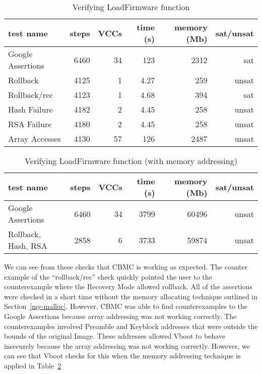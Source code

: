 \begin{table}[!htbp]
    \centering
    \caption{Verifying LoadFirmware function}\label{ldfw_results}
    \begin{tabular}{lrrrrr}
        \toprule
        test name & steps & VCCs  & time (s) & memory (Mb) & sat/unsat  \\ \midrule
        Google Assertions & 6460 & 34 & 123 & 2312 & sat \\
        Rollback     & 4125 & 1 & 4.27 & 259 & unsat \\
        Rollback/rec & 4123 & 1 & 4.68 & 394 & sat \\
        Hash Failure & 4182 & 2 & 4.45 & 258 & unsat \\
        RSA  Failure & 4180 & 2 & 4.45 & 258 & unsat \\
        Array Accesses & 4130 & 57 & 126 & 2487 & unsat \\\bottomrule
    \end{tabular}
\end{table}

\begin{table}[!htbp]
    \centering
    \caption{Verifying LoadFirmware function (with memory addressing)}\label{ldfw_results_malloc}
    \begin{tabular}{lrrrrr}
        \toprule
        test name & steps & VCCs  & time (s) & memory (Mb) & sat/unsat  \\ \midrule
        Google Assertions & 6460 & 34 & 3799 & 60496 & unsat \\
        Rollback, Hash, RSA & 2858 & 6 & 3733 & 59874 & unsat \\\bottomrule
    \end{tabular}
\end{table}

We can see from these checks that CBMC is working as expected.
The counter example of the ``rollback/rec'' check  quickly pointed the user to the counterexample where the Recovery Mode allowed rollback.
All of the assertions were checked in a short time without the memory allocating technique outlined in Section~\ref{my-malloc}. 
However, CBMC was able to find counterexamples to the Google Assertions because array addressing was not working correctly.
The counterexamples involved Preamble and Keyblock addresses that were outside the bounds of the original Image.
These addresses allowed Vboot to behave insecurely because the array addressing was not working correctly.
However, we can see that Vboot checks for this when the memory addressing technique is applied in Table~\ref{ldfw_results_malloc}

